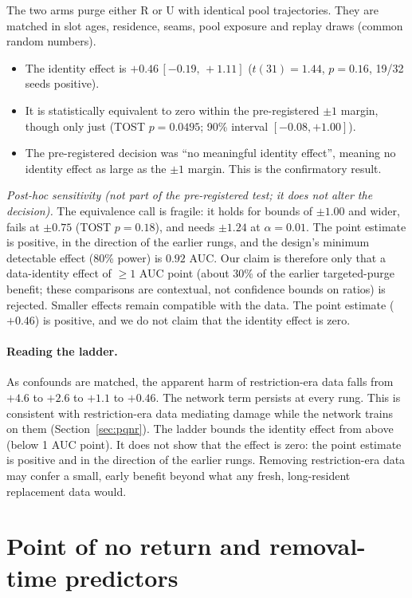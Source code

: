 \documentclass[10pt]{article} %
\newcommand{\ci}[2]{\,[#1,\,#2]}
\begin{document}
The two arms purge either R or U with identical pool trajectories. They are matched in slot ages, residence, seams, pool exposure and replay draws (common random numbers).
\begin{itemize}
\item The identity effect is $+0.46\ci{-0.19}{+1.11}$ ($t(31)=1.44$, $p=0.16$, 19/32 seeds positive).
\item It is statistically equivalent to zero within the pre-registered $\pm1$ margin, though only just (TOST $p=0.0495$; 90\% interval $[-0.08,+1.00]$).
\item The pre-registered decision was ``no meaningful identity effect'', meaning no identity effect as large as the $\pm1$ margin. This is the confirmatory result.
\end{itemize}
\emph{Post-hoc sensitivity (not part of the pre-registered test; it does not alter the decision).} The equivalence call is fragile: it holds for bounds of $\pm1.00$ and wider, fails at $\pm0.75$ (TOST $p=0.18$), and needs $\pm1.24$ at $\alpha=0.01$. The point estimate is positive, in the direction of the earlier rungs, and the design's minimum detectable effect (80\% power) is $0.92$ AUC. Our claim is therefore only that a data-identity effect of $\geq1$ AUC point (about 30\% of the earlier targeted-purge benefit; these comparisons are contextual, not confidence bounds on ratios) is rejected. Smaller effects remain compatible with the data. The point estimate ($+0.46$) is positive, and we do not claim that the identity effect is zero.

\paragraph{Reading the ladder.}
As confounds are matched, the apparent harm of restriction-era data falls from $+4.6$ to $+2.6$ to $+1.1$ to $+0.46$. The network term persists at every rung. This is consistent with restriction-era data mediating damage while the network trains on them (Section~\ref{sec:pqnr}). The ladder bounds the identity effect from above (below 1 AUC point). It does not show that the effect is zero: the point estimate is positive and in the direction of the earlier rungs. Removing restriction-era data may confer a small, early benefit beyond what any fresh, long-resident replacement data would.

\section{Point of no return and removal-time predictors}\label{sec:ponr}
\end{document}
